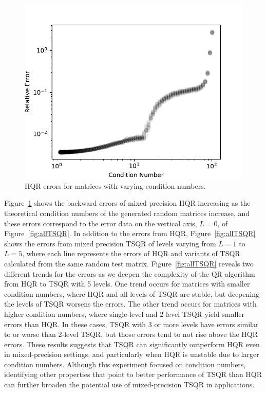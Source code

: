 \documentclass[review,onefignum,onetabnum]{siamart190516}
\begin{document}
\begin{figure}
	\centering
	\vspace{-10pt}
	\includegraphics[width=.4\textwidth]{./figures/unblocked.pdf}
	\caption{\label{fig:unblocked} HQR errors for matrices with varying condition numbers.}
\end{figure}
Figure~\ref{fig:unblocked} shows the backward errors of mixed precision HQR increasing as the theoretical condition numbers of the generated random matrices increase, and these errors correspond to the error data on the vertical axis, $L=0$, of Figure~\ref{fig:allTSQR}.
In addition to the errors from HQR, Figure~\ref{fig:allTSQR} shows the errors from mixed precision TSQR of levels varying from $L=1$ to $L=5$, where each line represents the errors of HQR and variants of TSQR calculated from the same random test matrix.
Figure~\ref{fig:allTSQR} reveals two different trends for the errors as we deepen the complexity of the QR algorithm from HQR to TSQR with 5 levels. 
One trend occurs for matrices with smaller condition numbers, where HQR and all levels of TSQR are stable, but deepening the levels of TSQR worsens the errors. 
The other trend occurs for matrices with higher condition numbers, where single-level and 2-level TSQR yield smaller errors than HQR. 
In these cases, TSQR with 3 or more levels have errors similar to or worse than 2-level TSQR, but those errors tend to not rise above the HQR errors.
These results suggests that TSQR can significantly outperform HQR even in mixed-precision settings, and particularly when HQR is unstable due to larger condition numbers.
Although this experiment focused on condition numbers, identifying other properties that point to better performance of TSQR than HQR can further broaden the potential use of mixed-precision TSQR in applications.
%
\end{document}
